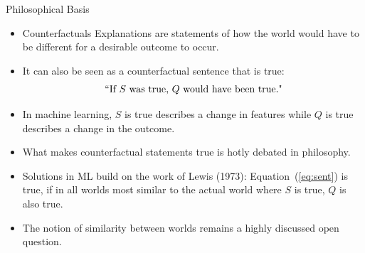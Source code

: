 \documentclass[11pt,compress,t,notes=noshow, xcolor=table]{beamer}
\begin{document}
\begin{vbframe}{Philosophical Basis}
	\begin{itemize}
		\item Counterfactuals Explanations are statements of how the world would have to be different for a desirable outcome to occur. 
		\item It can also be seen as a counterfactual sentence that is true: 
		\begin{equation}
			\textnormal{``If $S$ was true, $Q$ would have been true."}
			\label{eq:sent}
		\end{equation}
		\item In machine learning, $S$ is true describes a change in features while $Q$ is true describes a change in the outcome. 
		\item What makes counterfactual statements true is hotly debated in philosophy. 
		\item Solutions in ML build on the work of Lewis (1973): Equation~(\ref{eq:sent}) is true, if in all worlds most similar to the actual world where $S$ is true, $Q$ is also true. 
		\item The notion of similarity between worlds remains a highly discussed open question. 
	\end{itemize}
\end{vbframe}
\end{document}
